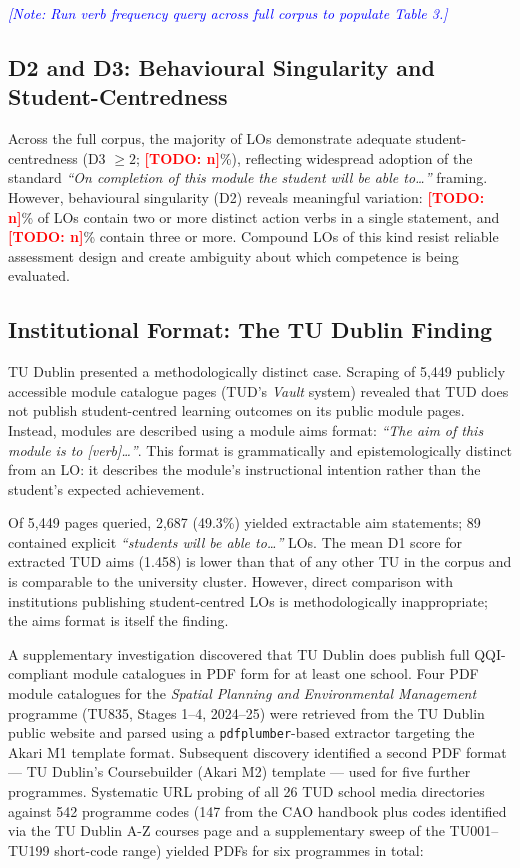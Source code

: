 \documentclass[12pt, a4paper]{article}
\newcommand{\todo}[1]{\textcolor{red}{\textbf{[TODO: #1]}}}
\newcommand{\note}[1]{\textcolor{blue}{\textit{[Note: #1]}}}
\begin{document}
\note{Run verb frequency query across full corpus to populate Table 3.}

\subsection{D2 and D3: Behavioural Singularity and Student-Centredness}

Across the full corpus, the majority of LOs demonstrate adequate student-centredness
(D3 $\geq 2$; \todo{n}\%), reflecting widespread adoption of the standard
\textit{``On completion of this module the student will be able to\ldots''} framing.
However, behavioural singularity (D2) reveals meaningful variation: \todo{n}\% of LOs
contain two or more distinct action verbs in a single statement, and \todo{n}\% contain
three or more. Compound LOs of this kind resist reliable assessment design and create
ambiguity about which competence is being evaluated.

\subsection{Institutional Format: The TU Dublin Finding}
\label{sec:tud}

TU Dublin presented a methodologically distinct case. Scraping of 5,449 publicly
accessible module catalogue pages (TUD's \textit{Vault} system) revealed that TUD
does not publish student-centred learning outcomes on its public module pages. Instead,
modules are described using a module aims format: \textit{``The aim of this module
is to [verb]\ldots''}. This format is grammatically and epistemologically distinct
from an LO: it describes the module's instructional intention rather than the
student's expected achievement.

Of 5,449 pages queried, 2,687 (49.3\%) yielded extractable aim statements; 89
contained explicit \textit{``students will be able to\ldots''} LOs. The mean D1
score for extracted TUD aims (1.458) is lower than that of any other TU in the
corpus and is comparable to the university cluster. However, direct comparison
with institutions publishing student-centred LOs is methodologically inappropriate;
the aims format is itself the finding.

A supplementary investigation discovered that TU Dublin does publish full
QQI-compliant module catalogues in PDF form for at least one school. Four PDF
module catalogues for the \textit{Spatial Planning and Environmental Management}
programme (TU835, Stages 1--4, 2024--25) were retrieved from the TU Dublin public
website and parsed using a \texttt{pdfplumber}-based extractor targeting the Akari
M1 template format. Subsequent discovery identified a second PDF format --- TU Dublin's
Coursebuilder (Akari M2) template --- used for five further programmes. Systematic
URL probing of all 26 TUD school media directories against 542 programme codes
(147 from the CAO handbook plus codes identified via the TU Dublin A-Z courses page
and a supplementary sweep of the TU001--TU199 short-code range)
yielded PDFs for six programmes in total:
\end{document}
